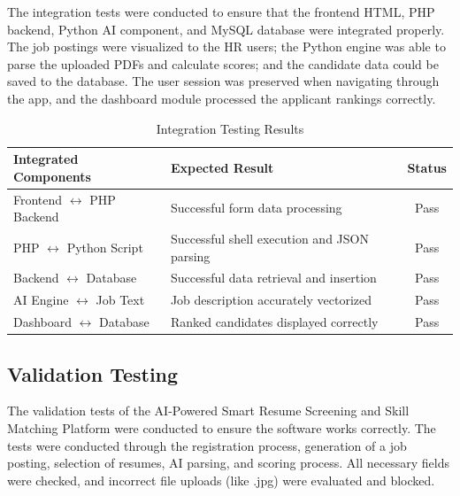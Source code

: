 \documentclass[12pt,a4paper]{report}
\begin{document}
The integration tests were conducted to ensure that the frontend HTML, PHP backend, Python AI component, and MySQL database were integrated properly. The job postings were visualized to the HR users; the Python engine was able to parse the uploaded PDFs and calculate scores; and the candidate data could be saved to the database. The user session was preserved when navigating through the app, and the dashboard module processed the applicant rankings correctly.

\begin{table}[H]
\centering
\renewcommand{\arraystretch}{1.4}
\begin{tabular}{|p{4cm}|p{5cm}|c|}
\hline
\textbf{Integrated Components} & \textbf{Expected Result} & \textbf{Status} \\ \hline
Frontend $\leftrightarrow$ PHP Backend & Successful form data processing & Pass \\ \hline
PHP $\leftrightarrow$ Python Script & Successful shell execution and JSON parsing & Pass \\ \hline
Backend $\leftrightarrow$ Database & Successful data retrieval and insertion & Pass \\ \hline
AI Engine $\leftrightarrow$ Job Text & Job description accurately vectorized & Pass \\ \hline
Dashboard $\leftrightarrow$ Database & Ranked candidates displayed correctly & Pass \\ \hline
\end{tabular}
\caption{Integration Testing Results}
\end{table}
\subsection{Validation Testing}

The validation tests of the AI-Powered Smart Resume Screening and Skill Matching Platform were conducted to ensure the software works correctly. The tests were conducted through the registration process, generation of a job posting, selection of resumes, AI parsing, and scoring process. All necessary fields were checked, and incorrect file uploads (like .jpg) were evaluated and blocked.
\end{document}
